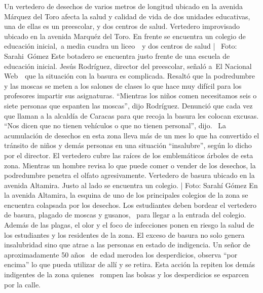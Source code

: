 \documentclass{article}%
\begin{document}
%
Un vertedero de desechos de varios metros de longitud ubicado en la avenida Márquez del Toro afecta la salud y calidad de vida de dos unidades educativas, una de ellas es un preescolar, y dos centros de salud.%
\newline%
%
Vertedero improvisado ubicado en la avenida Marquéz del Toro. En frente se encuentra un colegio de educación inicial,~a media cuadra un liceo~~y dos centros de salud |~ Foto: Sarahi~Gómez%
\newline%
%
Este botadero se encuentra justo frente de una escuela de educación inicial. Jesús Rodríguez, director del preescolar, señaló a~El Nacional Web~~que la situación con la basura es complicada. Resaltó que la podredumbre y las moscas se meten a los salones de clases lo que hace muy difícil para los profesores impartir sus asignaturas.%
\newline%
%
“Mientras los niños comen necesitamos seis o siete personas que espanten las moscas”, dijo Rodríguez.%
\newline%
%
Denunció que cada vez que llaman a la alcaldía de Caracas para que recoja la basura les colocan excusas. “Nos dicen que no tienen vehículos o que no tienen personal”, dijo. ~La acumulación de desechos en esta zona lleva más de un mes lo que ha convertido el tránsito de niños y demás personas en una situación “insalubre”, según lo dicho por el director.%
\newline%
%
El vertedero cubre las raíces de los emblemáticos árboles de esta zona. Mientras un hombre revisa lo que puede comer o vender de los desechos, la podredumbre penetra el olfato agresivamente.%
\newline%
%
Vertedero de basura ubicado en la avenida Altamira. Justo al lado se encuentra un colegio. | Foto: Sarahí Gómez%
\newline%
%
En la avenida Altamira, la esquina de uno de los principales colegios de la zona se encuentra colapsada por los desechos. Los estudiantes deben bordear el vertedero de basura, plagado de moscas y gusanos, ~para llegar a la entrada del colegio.%
\newline%
%
Además de las plagas, el olor y el foco de infecciones ponen en riesgo la salud de los estudiantes y los residentes de la zona.%
\newline%
%
El exceso de basura no solo genera insalubridad sino que atrae a las personas en estado de indigencia. Un señor de aproximadamente 50 años~ de edad merodea los desperdicios, observa “por encima” lo que pueda utilizar de allí y se retira. Esta acción la repiten los demás indigentes de la zona quienes~ rompen las bolsas y los desperdicios se esparcen por la calle.%
\end{document}
